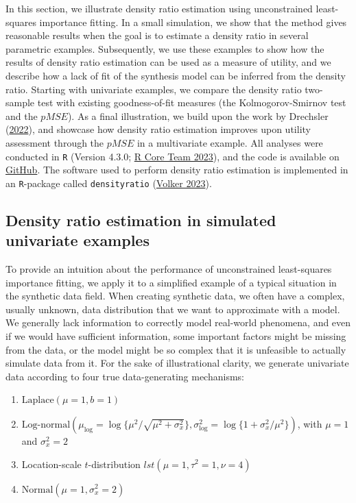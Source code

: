 \documentclass[
]{template/style/uneceart}
\providecommand{\tightlist}{%
  \setlength{\itemsep}{0pt}\setlength{\parskip}{0pt}}\usepackage{longtable,booktabs,array}
\begin{document}
In this section, we illustrate density ratio estimation using
unconstrained least-squares importance fitting. In a small simulation,
we show that the method gives reasonable results when the goal is to
estimate a density ratio in several parametric examples. Subsequently,
we use these examples to show how the results of density ratio
estimation can be used as a measure of utility, and we describe how a
lack of fit of the synthesis model can be inferred from the density
ratio. Starting with univariate examples, we compare the density ratio
two-sample test with existing goodness-of-fit measures (the
Kolmogorov-Smirnov test and the \(pMSE\)). As a final illustration, we
build upon the work by Drechsler
(\protect\hyperlink{ref-drechsler_utility_2022}{2022}), and showcase how
density ratio estimation improves upon utility assessment through the
\(pMSE\) in a multivariate example. All analyses were conducted in
\texttt{R} (Version 4.3.0; \protect\hyperlink{ref-R}{R Core Team 2023}),
and the code is available on
\href{https://github.com/thomvolker/unece-density-ratio}{GitHub}. The
software used to perform density ratio estimation is implemented in an
\texttt{R}-package called \texttt{densityratio}
(\protect\hyperlink{ref-densityratio}{Volker 2023}).

\hypertarget{density-ratio-estimation-in-simulated-univariate-examples}{%
\subsection{Density ratio estimation in simulated univariate
examples}\label{density-ratio-estimation-in-simulated-univariate-examples}}

To provide an intuition about the performance of unconstrained
least-squares importance fitting, we apply it to a simplified example of
a typical situation in the synthetic data field. When creating synthetic
data, we often have a complex, usually unknown, data distribution that
we want to approximate with a model. We generally lack information to
correctly model real-world phenomena, and even if we would have
sufficient information, some important factors might be missing from the
data, or the model might be so complex that it is unfeasible to actually
simulate data from it. For the sake of illustrational clarity, we
generate univariate data according to four true data-generating
mechanisms:

\begin{enumerate}
\def\labelenumi{\arabic{enumi}.}
\tightlist
\item
  \(\text{Laplace}(\mu = 1, b = 1)\)
\item
  \(\text{Log-normal}(\mu_{\log} = \log{\{\mu^2/\sqrt{\mu^2 + \sigma^2_x}\}}, \sigma^2_{\log} = \log{\{1 + \sigma^2_x/\mu^2\}})\),
  with \(\mu = 1\) and \(\sigma^2_x = 2\)
\item
  Location-scale \(t\)-distribution
  \(lst(\mu = 1, \tau^2 = 1, \nu = 4)\)
\item
  \(\text{Normal}(\mu = 1, \sigma^2_x = 2)\)
\end{enumerate}
\end{document}
